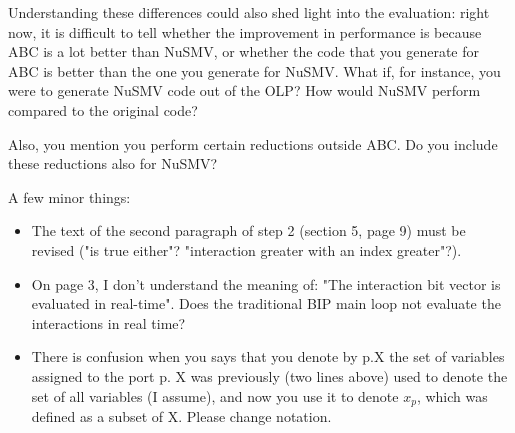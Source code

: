 Understanding these differences could also shed light into the evaluation:
right now, it is difficult to tell whether the improvement in performance is
because ABC is a lot better than NuSMV, or whether the code that you generate
for ABC is better than the one you generate for NuSMV. What if, for instance,
you were to generate NuSMV code out of the OLP? How would NuSMV perform
compared to the original code? 



Also, you mention you perform certain
reductions outside ABC. Do you include these reductions also for NuSMV?

A few minor things:

\begin{itemize}
\item The text of the second paragraph of step 2 (section 5, page 9) must be
revised ("is true either"? "interaction greater with an index greater"?).
\done
{}

\item On page 3, I don't understand the meaning of: "The interaction bit vector is
evaluated in real-time". Does the traditional BIP main loop not evaluate the
interactions in real time?
\done
{}

\item There is confusion when you says that you denote by p.X the set of variables
assigned to the port p. X was previously (two lines above) used to denote
the set of all variables (I assume), and now you use it to denote $x_p$, which
was defined as a subset of X. Please change notation.
\done
\end{itemize}
